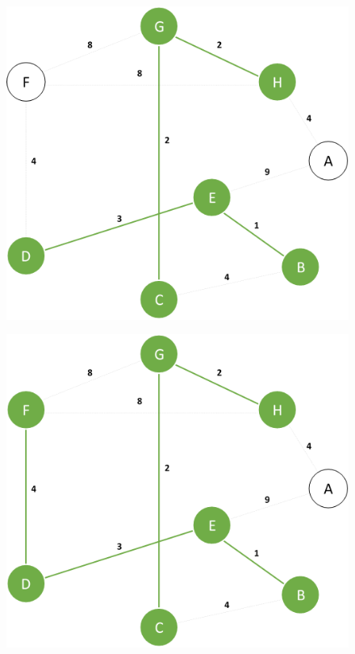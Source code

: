 \documentclass{article}
\begin{document}
\begin{figure}[H]
\centering
\includegraphics[scale=0.6]{images/Q3/05.png}
\end{figure}

\begin{figure}[H]
\centering
\includegraphics[scale=0.6]{images/Q3/06.png}
\end{figure}
\end{document}
